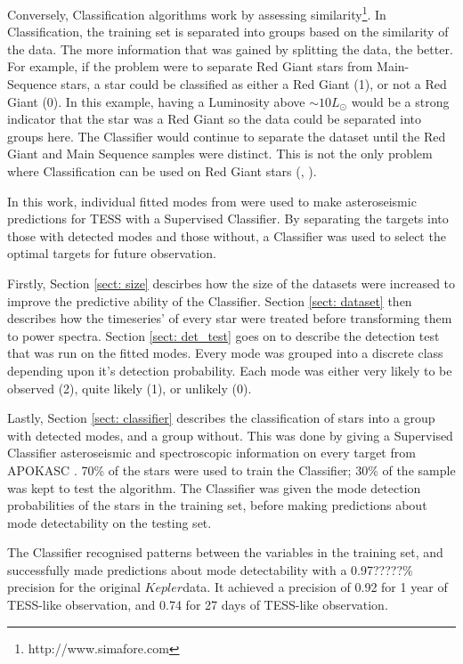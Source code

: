 \documentclass[a4paper,fleqn,usenatbib,useAMS]{mnras}
\newcommand{\kep}{\ensuremath{Kepler}\:}
\begin{document}
Conversely, Classification algorithms work by assessing similarity\footnote{http://www.simafore.com}. In Classification, the training set is separated into groups based on the similarity of the data. The more information that was gained by splitting the data, the better. For example, if the problem were to separate Red Giant stars from Main-Sequence stars, a star could be classified as either a Red Giant (1), or not a Red Giant (0). In this example, having a Luminosity above $\sim10L_{\odot}$ would be a strong indicator that the star was a Red Giant so the data could be separated into groups here. The Classifier would continue to separate the dataset until the Red Giant and Main Sequence samples were distinct. This is not the only problem where Classification can be used on Red Giant stars (\citet{ness_cannon_2015}, \citet{wu_mass_2017}).

In this work, individual fitted modes from \citet{davies_asteroseismology_2016} were used to make asteroseismic predictions for TESS with a Supervised Classifier. By separating the targets into those with detected modes and those without, a Classifier was used to select the optimal targets for future observation.

Firstly, Section \ref{sect: size} descirbes how the size of the datasets were increased to improve the predictive ability of the Classifier. Section \ref{sect: dataset} then describes how the timeseries' of every star were treated before transforming them to power spectra. Section \ref{sect: det_test} goes on to describe the detection test that was run on the fitted modes. Every mode was grouped into a discrete class depending upon it's detection probability. Each mode was either very likely to be observed (2), quite likely (1), or unlikely (0).

Lastly, Section \ref{sect: classifier} describes the classification of stars into a group with detected modes, and a group without. This was done by giving a Supervised Classifier asteroseismic and spectroscopic information on every target from APOKASC \citep{pinsonneault_apokasc_2014}. 70\% of the stars were used to train the Classifier; 30\% of the sample was kept to test the algorithm. The Classifier was given the mode detection probabilities of the stars in the training set, before making predictions about mode detectability on the testing set.

The Classifier recognised patterns between the variables in the training set, and successfully made predictions about mode detectability with a 0.97?????\% precision for the original \kep data. It achieved a precision of 0.92 for 1 year of TESS-like observation, and 0.74 for 27 days of TESS-like observation.
\end{document}
